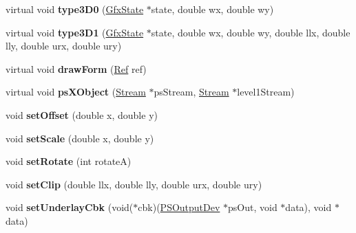 \begin{DoxyCompactItemize}
\item 
\mbox{\label{class_p_s_output_dev_a9f3a0617e53849e37ec2c6400cf95a18}} 
virtual void {\bfseries type3\+D0} (\hyperlink{class_gfx_state}{Gfx\+State} $\ast$state, double wx, double wy)
\item 
\mbox{\label{class_p_s_output_dev_a91eb20d14624e5538835b5ff935d1250}} 
virtual void {\bfseries type3\+D1} (\hyperlink{class_gfx_state}{Gfx\+State} $\ast$state, double wx, double wy, double llx, double lly, double urx, double ury)
\item 
\mbox{\label{class_p_s_output_dev_af43d623610903368c2a862ece5b2198f}} 
virtual void {\bfseries draw\+Form} (\hyperlink{struct_ref}{Ref} ref)
\item 
\mbox{\label{class_p_s_output_dev_a0fd516394facbe143f8b132eda182aae}} 
virtual void {\bfseries ps\+X\+Object} (\hyperlink{class_stream}{Stream} $\ast$ps\+Stream, \hyperlink{class_stream}{Stream} $\ast$level1\+Stream)
\item 
\mbox{\label{class_p_s_output_dev_a8ff8ced0be68d41830c66ac50c15ed4d}} 
void {\bfseries set\+Offset} (double x, double y)
\item 
\mbox{\label{class_p_s_output_dev_a82a92b22d6e580868768de9acb691f8e}} 
void {\bfseries set\+Scale} (double x, double y)
\item 
\mbox{\label{class_p_s_output_dev_a97eee03b9871943e7a48867741732830}} 
void {\bfseries set\+Rotate} (int rotateA)
\item 
\mbox{\label{class_p_s_output_dev_a4c5dc81e734348122604e9ecc8d2dd23}} 
void {\bfseries set\+Clip} (double llx, double lly, double urx, double ury)
\item 
\mbox{\label{class_p_s_output_dev_a4a0541e82e883541e24ef039a9cc899b}} 
void {\bfseries set\+Underlay\+Cbk} (void($\ast$cbk)(\hyperlink{class_p_s_output_dev}{P\+S\+Output\+Dev} $\ast$ps\+Out, void $\ast$data), void $\ast$data)
\item 
\mbox{\label{class_p_s_output_dev_a54582cc9fe4fed62716e51d6934536e7}} 

\end{DoxyCompactItemize}

